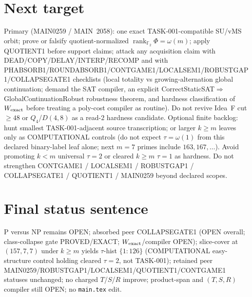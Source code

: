 \documentclass[11pt]{article}
\begin{document}
\section*{Next target}
Primary (MAIN0259 / MAIN~2058): one exact TASK-001-compatible SU/vMS orbit; prove or falsify
quotient-normalized $\operatorname{rank}_{\mathbb F_2}\Phi=\omega(m)$; apply QUOTIENT1 before support claims;
attack any acquisition claim with
DEAD/COPY/DELAY/INTERP/RECOMP and with PHABSORB1/ROUNDABSORB1/CONTGAME1/LOCALSEM1/ROBUSTGAP1/COLLAPSEGATE1
checklists
(local totality vs growing-alternation global continuation; demand the SAT compiler, an
explicit CorrectStaticSAT$\Rightarrow$GlobalContinuationRobust robustness theorem, and hardness
classification of $W_{\rm exact}$ before treating a poly-cost compiler as routine).
Do not revive Idea~F cut$\ge48$ or $Q_4$/$D(4,8)$ as a read-$2$ hardness candidate.
Optional finite backlog: hunt smallest TASK-001-adjacent source transcription;
or larger $k{\ge}m$ leaves only as COMPUTATIONAL controls (do not expect $\tau=\omega(1)$
from this declared binary-label leaf alone; next $m{=}7$ primes include $163,167,\ldots$).
Avoid promoting $k{<}m$ universal $\tau{=}2$ or cleared $k{\ge}m$ $\tau{=}1$ as hardness.
Do not strengthen CONTGAME1 / LOCALSEM1 / ROBUSTGAP1 / COLLAPSEGATE1 / QUOTIENT1 / MAIN0259 beyond declared scopes.

\section*{Final status sentence}
P versus NP remains OPEN; absorbed peer COLLAPSEGATE1 (OPEN overall; class-collapse gate PROVED/EXACT; $W_{\rm exact}$/compiler OPEN); slice-cover at $(157,7,7)$ under $k{\ge}m$ yields $\tau$-hist $\{1{:}126\}$ (COMPUTATIONAL easy-structure control holding cleared $\tau{=}2$, not TASK-001); retained peer MAIN0259/ROBUSTGAP1/LOCALSEM1/QUOTIENT1/CONTGAME1 statuses unchanged; no charged $T$/$S$/$R$ improve; product-span and $(T,S,R)$ compiler still OPEN; no \texttt{main.tex} edit.
\end{document}
